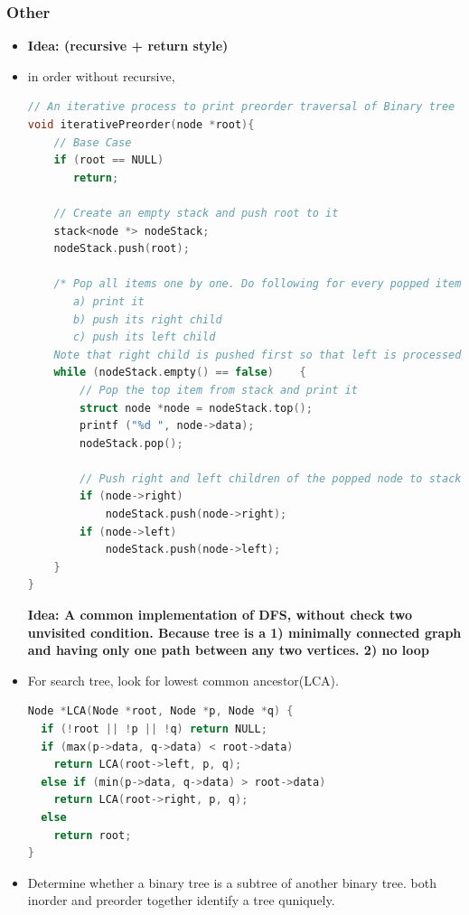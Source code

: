 \documentclass[a4paper,11pt,twoside]{book}
\begin{document}
\subsubsection{Other}
\begin{itemize}


\item \textbf{Idea: (recursive + return style)}

\item in order without recursive, 
\begin{lstlisting}[frame=single, language=c++]
// An iterative process to print preorder traversal of Binary tree
void iterativePreorder(node *root){
    // Base Case
    if (root == NULL)
       return;
 
    // Create an empty stack and push root to it
    stack<node *> nodeStack;
    nodeStack.push(root);
 
    /* Pop all items one by one. Do following for every popped item
       a) print it
       b) push its right child
       c) push its left child
    Note that right child is pushed first so that left is processed first */
    while (nodeStack.empty() == false)    {
        // Pop the top item from stack and print it
        struct node *node = nodeStack.top();
        printf ("%d ", node->data);
        nodeStack.pop();
 
        // Push right and left children of the popped node to stack
        if (node->right)
            nodeStack.push(node->right);
        if (node->left)
            nodeStack.push(node->left);
    }
}
\end{lstlisting}

\textbf{Idea: A common implementation of DFS, without check two unvisited condition. Because tree is a 1) minimally connected graph and having only one path between any two vertices. 2) no loop}

\item For search tree, look for lowest common ancestor(LCA). 
\begin{lstlisting}[frame=single, language=c++]
Node *LCA(Node *root, Node *p, Node *q) {
  if (!root || !p || !q) return NULL;
  if (max(p->data, q->data) < root->data)
    return LCA(root->left, p, q);
  else if (min(p->data, q->data) > root->data)
    return LCA(root->right, p, q);
  else
    return root;
}

\end{lstlisting}

\item Determine whether a binary tree is a subtree of another binary tree. both inorder and preorder together identify a tree quniquely.


\end{itemize}
\end{document}
